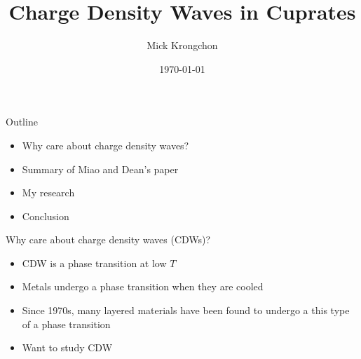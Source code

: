 \documentclass{beamer}
\title[]{Charge Density Waves in Cuprates}
\author{Mick Krongchon}
\institute{University of Illinois at Urbana-Champaign}
\date{\today}
\begin{document}
\begin{frame}
\titlepage
\end{frame}

\begin{frame}{Outline}
\begin{itemize}
\item Why care about charge density waves?
\item Summary of Miao and Dean's paper
\item My research
\item Conclusion
\end{itemize}
\end{frame}

\begin{frame}{Why care about charge density waves (CDWs)?}
\begin{itemize}
\item CDW is a phase transition at low $T$
\item Metals undergo a phase transition when they are cooled
\item Since 1970s, many layered materials have been found to undergo a this type of a phase transition
\item Want to study CDW
\end{itemize}
\end{frame}

\end{document}
